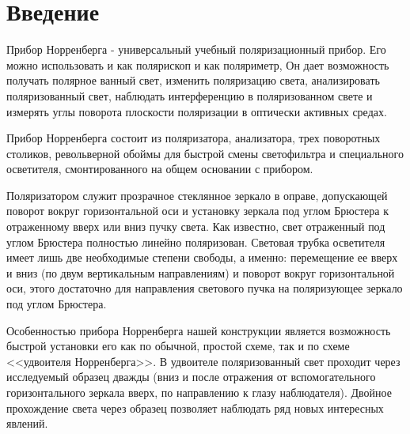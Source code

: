 
\usepackage{setspace}


\def\labauthors{Понур К.А., Сарафанов Ф.Г., Сидоров Д.А.}
\def\labgroup{420}
\def\labnumber{312}
\def\labtheme{Изучение явлений двулучепреломления и поляризации света на приборе Норренберга}
\renewcommand{\vec}{\mathbf}
\renewcommand{\Re}{\operatorname{Re}}
\renewcommand{\Im}{\operatorname{Im}}
\renewcommand{\phi}{\varphi}
\renewcommand{\kappa}{\varkappa}
\renewcommand{\hat}{\widehat}

\begin{spacing}{1}
\tableofcontents
\end{spacing}
\newpage
 
\section*{Введение}
Прибор Норренберга - универсальный учебный поляризационный
прибор. Его можно использовать и как полярископ и как поляриметр,
Он дает возможность получать полярное ванный свет, изменить поляризацию света, анализировать поляризованный свет, наблюдать интерференцию в поляризованном свете и измерять углы поворота плоскости поляризации в оптически активных средах.

Прибор Норренберга состоит из поляризатора, анализатора,
трех поворотных столиков, револьверной обоймы для быстрой смены
светофильтра и специального осветителя, смонтированного на общем основании с прибором.

Поляризатором служит прозрачное стеклянное зеркало в оправе, допускающей поворот вокруг горизонтальной оси и установку зеркала под углом Брюстера к отраженному вверх или вниз пучку света. Как известно, свет отраженный под углом Брюстера пол­ностью линейно поляризован. Световая трубка осветителя имеет
лишь две необходимые степени свободы, а именно: перемещение ее вверх и вниз (по двум вертикальным направлениям) и поворот вокруг горизонтальной оси, этого достаточно для направления светового пучка на поляризующее зеркало под углом Брюстера.

Особенностью прибора Норренберга нашей конструкции являет­ся возможность быстрой установки его как по обычной, простой схеме, так и по схеме <<удвоителя Норренберга>>. В удвоителе поляризованный свет проходит через исследуемый образец дважды (вниз и после отражения от вспомогательного
горизонтального зеркала вверх, по направлению к глазу наблюдателя). Двойное прохождение света через образец позволяет наблюдать ряд новых интересных явлений.

